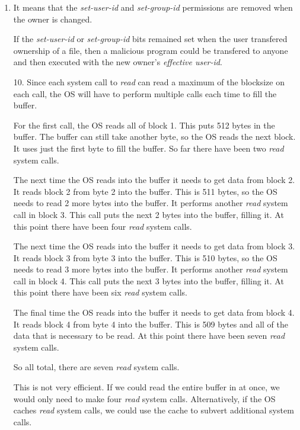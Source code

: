 \documentclass[12pt,letterpaper]{article}
\begin{document}
\begin{enumerate}
    \item
      It means that the \textit{set-user-id} and \textit{set-group-id} permissions are removed when the owner is changed.

      If the \textit{set-user-id} or \textit{set-group-id} bits remained set when the user transfered ownership of a file,
      then a malicious program could be transfered to anyone and then executed with the new owner's \textit{effective user-id}.

    \item [10.]
      Since each system call to \textit{read} can read a maximum of the blocksize on each call,
      the OS will have to perform multiple calls each time to fill the buffer.

      For the first call, the OS reads all of block 1.
      This puts 512 bytes in the buffer.
      The buffer can still take another byte,
      so the OS reads the next block.
      It uses just the first byte to fill the buffer.
      So far there have been two \textit{read} system calls.

      The next time the OS reads into the buffer it needs to get data from block 2.
      It reads block 2 from byte 2 into the buffer.
      This is 511 bytes, so the OS needs to read 2 more bytes into the buffer.
      It performs another \textit{read} system call in block 3.
      This call puts the next 2 bytes into the buffer, filling it.
      At this point there have been four \textit{read} system calls.

      The next time the OS reads into the buffer it needs to get data from block 3.
      It reads block 3 from byte 3 into the buffer.
      This is 510 bytes, so the OS needs to read 3 more bytes into the buffer.
      It performs another \textit{read} system call in block 4.
      This call puts the next 3 bytes into the buffer, filling it.
      At this point there have been six \textit{read} system calls.

      The final time the OS reads into the buffer it needs to get data from block 4.
      It reads block 4 from byte 4 into the buffer.
      This is 509 bytes and all of the data that is necessary to be read.
      At this point there have been seven \textit{read} system calls.

      So all total, there are seven \textit{read} system calls.

      This is not very efficient.
      If we could read the entire buffer in at once,
      we would only need to make four \textit{read} system calls.
      Alternatively, if the OS caches \textit{read} system calls,
      we could use the cache to subvert additional system calls.


\end{enumerate}
\end{document}
